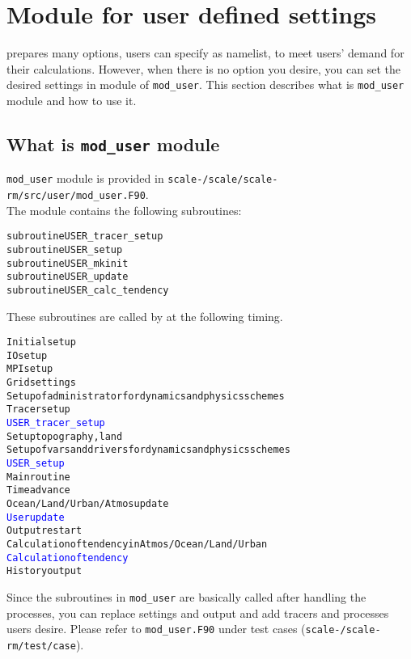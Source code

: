 \section{Module for user defined settings} \label{sec:mod_user}

\scale prepares many options, users can specify as namelist, to meet users' demand for their calculations.
However, when there is no option you desire, you can set the desired settings in module of \verb|mod_user|.
This section describes what is \verb|mod_user| module and how to use it.


\subsection{What is \texttt{mod\_user} module}

\verb|mod_user| module is provided in \texttt{scale-{\version}/scale/scale-rm/src/user/mod\_user.F90}.\\
The module contains the following subroutines:
\begin{alltt}
  subroutine USER_tracer_setup
  subroutine USER_setup
  subroutine USER_mkinit
  subroutine USER_update
  subroutine USER_calc_tendency
\end{alltt}

\noindent These subroutines are called by \scale at the following timing.
\begin{alltt}
Initial setup
  IO setup
  MPI setup
  Grid settings
  Setup of administrator for dynamics and physics schemes 
  Tracer setup
  \textcolor{blue}{USER_tracer_setup}
  Setup topography, land
  Setup of vars and drivers for dynamics and physics schemes 
  \textcolor{blue}{USER_setup}
Main routine
  Time advance
  Ocean/Land/Urban/Atmos update
  \textcolor{blue}{User update}
  Output restart
  Calculation of tendency in Atmos/Ocean/Land/Urban
  \textcolor{blue}{Calculation of tendency}
  History output
\end{alltt}

Since the subroutines in \verb|mod_user| are basically called after handling the processes,
you can replace settings and output and add tracers and processes users desire.
Please refer to \verb|mod_user.F90| under test cases (\texttt{scale-{\version}/scale-rm/test/case}).

